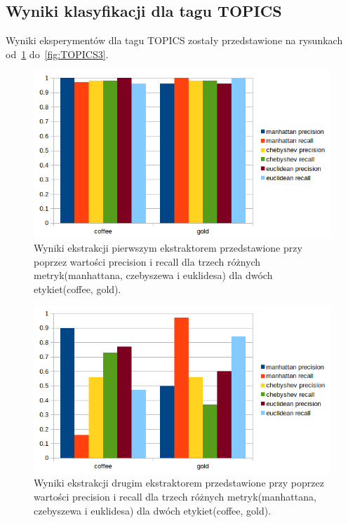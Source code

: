 \documentclass{classrep}
\begin{document}
\newpage
\subsection{Wyniki klasyfikacji dla tagu TOPICS}
Wyniki eksperymentów dla tagu TOPICS zostały przedstawione na rysunkach od~\ref{fig:TOPICS1} do~\ref{fig:TOPICS3}.\\
\begin{figure}[H]
  \includegraphics[width=\linewidth]{wykresy/1ext2tag3mp_precrec.png}
  \caption{Wyniki ekstrakcji pierwszym ekstraktorem przedstawione przy poprzez wartości precision i recall dla trzech różnych metryk(manhattana, czebyszewa i euklidesa) dla dwóch etykiet(coffee, gold).}
  \label{fig:TOPICS1}
\end{figure}
\begin{figure}[H]
  \includegraphics[width=\linewidth]{wykresy/2ext2tag3mp_precrec.png}
  \caption{Wyniki ekstrakcji drugim ekstraktorem przedstawione przy poprzez wartości precision i recall dla trzech różnych metryk(manhattana, czebyszewa i euklidesa) dla dwóch etykiet(coffee, gold).}
  \label{fig:TOPICS2}
\end{figure}
\end{document}
